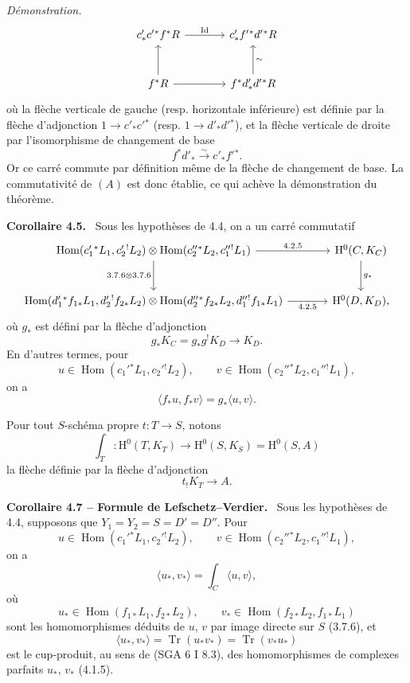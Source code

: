 \documentclass[11pt]{article}
\newenvironment{statement}[1]{\par\medskip\noindent\textbf{#1.}\ }{\par\medskip}
\newenvironment{prooftext}[1][Proof]{\par\noindent\emph{#1.}\ }{\par\medskip}
\renewcommand{\H}{\mathrm{H}}
\DeclareMathOperator{\Hom}{Hom}
\providecommand{\Id}{\mathrm{Id}}
\providecommand{\lisom}{\xrightarrow{\sim}}
\providecommand{\Tr}{\operatorname{Tr}}
\providecommand{\Tr}{\operatorname{Tr}}
\providecommand{\Tr}{\operatorname{Tr}}
\providecommand{\Hom}{\operatorname{Hom}}
\providecommand{\Tr}{\operatorname{Tr}}
\providecommand{\Hom}{\operatorname{Hom}}
\providecommand{\Tr}{\operatorname{Tr}}
\begin{document}
\begin{prooftext}[Démonstration]
\[\begin{tikzcd}[column sep=large,row sep=large]
c'_*c'{}^*f^*R \arrow[r,"\Id"] &
c'_*f'{}^*d'{}^*R\\
f^*R \arrow[u] \arrow[r] &
f^*d'_*d'{}^*R\arrow[u,"\sim"']
\end{tikzcd}
\]
où la flèche verticale de gauche (resp. horizontale inférieure) est définie par la flèche d'adjonction $1\longrightarrow c'_*c'{}^*$ (resp. $1\longrightarrow d'_*d'{}^*$), et la flèche verticale de droite par l'isomorphisme de changement de base
\[
f^*d'_*\lisom c'_*f'{}^*.
\]
Or ce carré commute par définition même de la flèche de changement de base. La commutativité de $(A)$ est donc établie, ce qui achève la démonstration du théorème.
\end{prooftext}

\begin{statement}{Corollaire 4.5}
Sous les hypothèses de 4.4, on a un carré commutatif
\[
\begin{tikzcd}[column sep=large,row sep=large]
\Hom(c_1'{}^*L_1,c_2'{}^!L_2)\otimes
\Hom(c_2''{}^*L_2,c_1''{}^!L_1)
 \arrow[r,"4.2.5"] \arrow[d,"3.7.6\otimes 3.7.6"'] &
\H^0(C,K_C)\arrow[d,"g_*"]\\
\Hom(d_1'{}^*f_{1*}L_1,d_2'{}^!f_{2*}L_2)\otimes
\Hom(d_2''{}^*f_{2*}L_2,d_1''{}^!f_{1*}L_1)
 \arrow[r,"4.2.5"'] &
\H^0(D,K_D),
\end{tikzcd}
\]
où $g_*$ est défini par la flèche d'adjonction
\[
g_*K_C=g_*g^!K_D\longrightarrow K_D.
\]
En d'autres termes, pour
\[
u\in\Hom(c_1'{}^*L_1,c_2'{}^!L_2),\qquad
v\in\Hom(c_2''{}^*L_2,c_1''{}^!L_1),
\]
on a
\begin{equation}
\tag{4.5.1}
\langle f_*u,f_*v\rangle=g_*\langle u,v\rangle.
\end{equation}
\end{statement}

Pour tout $S$-schéma propre $t:T\longrightarrow S$, notons
\begin{equation}
\tag{4.6}
\int_T:\H^0(T,K_T)\longrightarrow \H^0(S,K_S)=\H^0(S,A)
\end{equation}
la flèche définie par la flèche d'adjonction
\[
t_!K_T\longrightarrow A.
\]

\begin{statement}{Corollaire 4.7 -- Formule de Lefschetz--Verdier}
Sous les hypothèses de 4.4, supposons que $Y_1=Y_2=S=D'=D''$. Pour
\[
u\in\Hom(c_1'{}^*L_1,c_2'{}^!L_2),\qquad
v\in\Hom(c_2''{}^*L_2,c_1''{}^!L_1),
\]
on a
\begin{equation}
\tag{4.7.1}
\langle u_*,v_*\rangle=\int_C\langle u,v\rangle,
\end{equation}
où
\[
u_*\in\Hom(f_{1*}L_1,f_{2*}L_2),\qquad
v_*\in\Hom(f_{2*}L_2,f_{1*}L_1)
\]
sont les homomorphismes déduits de $u$, $v$ par image directe sur $S$ (3.7.6), et
\[
\langle u_*,v_*\rangle=\Tr(u_*v_*)=\Tr(v_*u_*)
\]
est le cup-produit, au sens de (SGA 6 I 8.3), des homomorphismes de complexes parfaits $u_*$, $v_*$ (4.1.5).
\end{statement}
\end{document}
